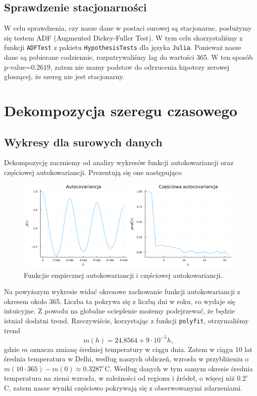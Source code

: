 \documentclass[12pt]{article}
\theoremstyle{exer}
\begin{document}
	\subsection{Sprawdzenie stacjonarności}	
	W celu sprawdzenia, czy nasze dane w postaci surowej są stacjonarne, posłużymy się testem ADF (Augmented Dickey-Fuller Test). W tym celu skorzystaliśmy z funkcji \verb*|ADFTest| z pakietu \verb*|HypothesisTests| dla języka \verb*|Julia|. Ponieważ nasze dane są pobierane codziennie, rozpatrywaliśmy lag do wartości 365. W ten sposób p-value=$0.2619$, zatem nie mamy podstaw do odrzucenia hipotezy zerowej głoszącej, że szereg nie jest stacjonarny.
	
	
	
	\section{Dekompozycja szeregu czasowego}
	\subsection{Wykresy dla surowych danych}
	Dekompozycję zaczniemy od analizy wykresów funkcji autokowariancji oraz częściowej autokowariancji. Prezentują się one następująco
	\begin{figure}[H]\label{fig:dry_cov}
		\includegraphics[width=\columnwidth]{Budnik/img/auto_dry.png}
		\caption{Funkcjie empircznej autokowariancji i częściowej autokowariancji.}
	\end{figure}
	Na powyższym wykresie widać okresowe zachowanie funkcji autokowariancji z okresem około 365. Liczba ta pokrywa się z liczbą dni w roku, co wydaje się intuicyjne. Z powodu na globalne ocieplenie możemy podejrzewać, że będzie istniał dodatni trend. Rzeczywiście, korzystając z funkcji \verb*|polyfit|, otrzymaliśmy trend
	\begin{equation}
		m(h)=24.8564+9\cdot10^{-5}h,
	\end{equation}  
	gdzie $m$ oznacza zmianę średniej temperatury w ciągu dnia. Zatem w ciągu 10 lat średnia temperatura w Delhi, według naszych obliczeń, wzrosła w przybliżeniu o $m(10\cdot365)-m(0)\approx0.3287^\circ$C. Według danych w tym samym okresie średnia temperatura na ziemi wzrosła, w zależności od regionu i źródeł, o więcej niż $0.2^\circ$C, zatem nasze wyniki częściowo pokrywają się z obserwowanymi zdarzeniami.
\end{document}
